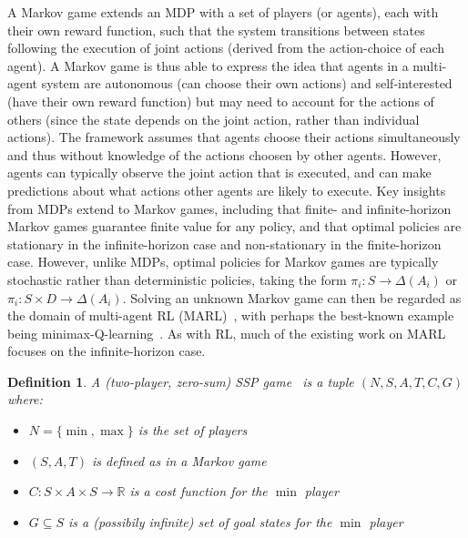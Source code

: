 \documentclass[10pt]{article}
\theoremstyle{plain}
\newtheorem{definition}{Definition}
\begin{document}
A Markov game extends an MDP with a set of players (or agents), each with their own reward function, such that the system transitions between states following the execution of joint actions (derived from the action-choice of each agent).
A Markov game is thus able to express the idea that agents in a multi-agent system are autonomous (can choose their own actions) and self-interested (have their own reward function) but may need to account for the actions of others (since the state depends on the joint action, rather than individual actions).
The framework assumes that agents choose their actions simultaneously and thus without knowledge of the actions choosen by other agents.
However, agents can typically observe the joint action that is executed, and can make predictions about what actions other agents are likely to execute.
Key insights from MDPs extend to Markov games, including that finite- and infinite-horizon Markov games guarantee finite value for any policy, and that optimal policies are stationary in the infinite-horizon case and non-stationary in the finite-horizon case.
However, unlike MDPs, optimal policies for Markov games are typically stochastic rather than deterministic policies, taking the form $\pi_{i} : S \to \Delta(A_{i})$ or $\pi_{i} : S \times D \to \Delta(A_{i})$.
Solving an unknown Markov game can then be regarded as the domain of multi-agent RL (MARL)~\cite{Busoniu:TSMC:2008}, with perhaps the best-known example being minimax-Q-learning~\cite{Littman:ICML:1994}.
As with RL, much of the existing work on MARL focuses on the infinite-horizon case.

\begin{definition}
    A (two-player, zero-sum) SSP game~\cite{Patek:PhD:1997,Patek:JCO:1999} is a tuple $(N, S, A, T, C, G)$ where:
    \begin{itemize}
        \item $N = \{ \min, \max \}$ is the set of players
        \item $(S, A, T)$ is defined as in a Markov game
        \item $C : S \times A \times S \to \mathbb{R}$ is a cost function for the $\min$ player
        \item $G \subseteq S$ is a (possibily infinite) set of goal states for the $\min$ player
    \end{itemize}
\end{definition}
\end{document}
